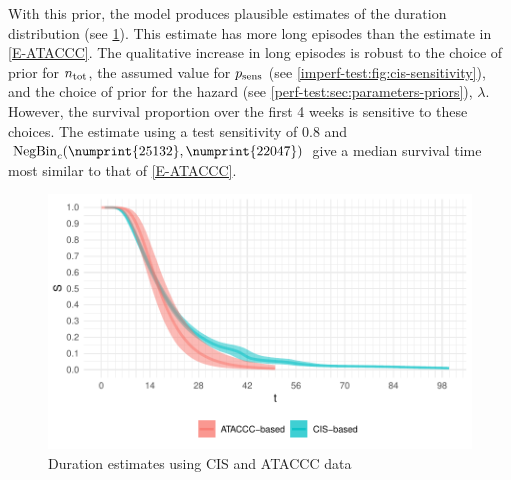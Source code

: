 \documentclass[thesis.tex]{subfiles}
\begin{document}
With this prior, the model produces plausible estimates of the duration distribution (see \cref{imperf-test:fig:cis-estimates}).
This estimate has more long episodes than the estimate in \cref{E-ATACCC}.
The qualitative increase in long episodes is robust to the choice of prior for $n_\text{tot}$, the assumed value for $p_\text{sens}$ (see \cref{imperf-test:fig:cis-sensitivity}), and the choice of prior for the hazard (see \cref{perf-test:sec:parameters-priors}), $\lambda$.
However, the survival proportion over the first 4 weeks is sensitive to these choices.
The estimate using a test sensitivity of 0.8 and $\NBc(\numprint{25132}, \numprint{22047})$ give a median survival time most similar to that of \cref{E-ATACCC}.
\begin{figure}
  \centering \includegraphics{cis-imperfect-testing/CIS_final}
  \caption{Duration estimates using CIS and ATACCC data}
  \label{imperf-test:fig:cis-estimates}
\end{figure}
\end{document}

